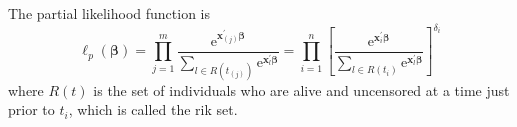 The partial likelihood function is
\begin{equation}
    \ell_{p}(\boldsymbol{\beta})=\prod_{j=1}^{m}\frac{\mathrm{e}^{\mathbf{x}_{(j)}^{\prime}\boldsymbol{\beta}}}{\sum_{l\in R\left(t_{(j)}\right)}\mathrm{e}^{\mathbf{x}_{l}^{\prime}\boldsymbol{\beta}}}=\prod_{i=1}^{n}\left[\frac{\mathrm{e}^{\mathbf{x}_{i}^{\prime}\boldsymbol{\beta}}}{\sum_{l\in R\left(t_{i}\right)}\mathrm{e}^{\mathbf{x}_{l}^{\prime}\boldsymbol{\beta}}}\right]^{\delta_{i}}
\end{equation}
where $R(t)$ is the set of individuals who are alive and uncensored at a time just prior to $t_{i}$, which is called the rik set.
